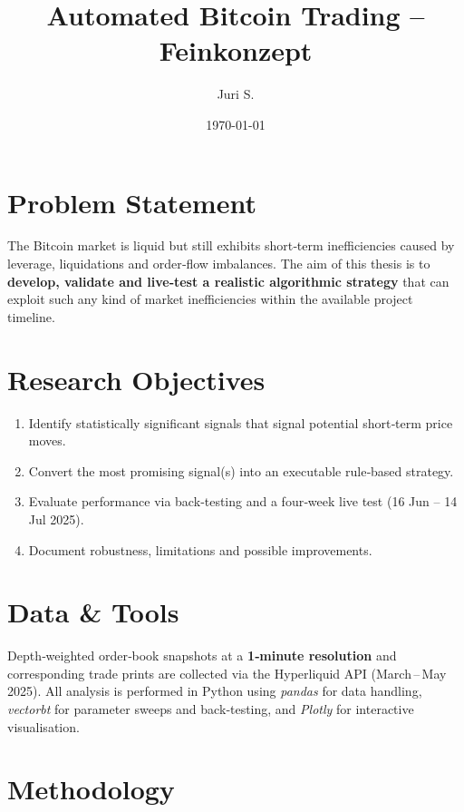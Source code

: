 \documentclass[a4paper,12pt]{article}
\title{Automated Bitcoin Trading – Feinkonzept}
\author{Juri S.}
\date{\today}
\begin{document}
\maketitle
\tableofcontents
\newpage

\section{Problem Statement}

The Bitcoin market is liquid but still exhibits short‑term inefficiencies
caused by leverage, liquidations and order‑flow imbalances.  
The aim of this thesis is to \textbf{develop, validate and live‑test a
realistic algorithmic strategy} that can exploit such any kind of market inefficiencies
 within the available project timeline.

\section{Research Objectives}

\begin{enumerate}
  \item Identify statistically significant signals that
        signal potential short‑term price moves.
  \item Convert the most promising signal(s) into an executable
        rule‑based strategy.
  \item Evaluate performance via back‑testing and a four‑week live test
        (16 Jun – 14 Jul 2025).
  \item Document robustness, limitations and possible improvements.
\end{enumerate}

\section{Data \& Tools}

Depth‑weighted order‑book snapshots at a \textbf{1‑minute resolution}
and corresponding trade prints are collected via the Hyperliquid API
(March\,--\,May\,2025).  All analysis is performed in Python using
\emph{pandas} for data handling, \emph{vectorbt} for parameter sweeps
and back‑testing, and \emph{Plotly} for interactive visualisation.
\section{Methodology}
\end{document}
